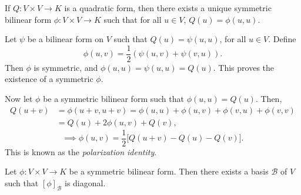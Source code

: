 \documentclass[12pt]{article}
\begin{document}
\begin{proposition}
	If $Q : V \times V \to K$ is a quadratic form, then there exists a unique symmetric bilinear form $\phi : V \times V \to K$ such that for all $u \in V$, $Q(u) = \phi(u, u)$.
\end{proposition}

\begin{proofbox}
	Let $\psi$ be a bilinear form on $V$ such that $Q(u) = \psi(u, u)$, for all $u \in V$. Define
	 \[
		 \phi(u, v) = \frac{1}{2}(\psi(u, v) + \psi(v,u))
	.\]
	Then $\phi$ is symmetric, and $\phi(u, u) = \psi(u, u) = Q(u)$. This proves the existence of a symmetric $\phi$.

	Now let $\phi$ be a symmetric bilinear form such that $\phi(u, u) = Q(u)$. Then,
	\begin{align*}
		Q(u + v) &= \phi(u + v, u + v) = \phi(u, u) + \phi(u, v) + \phi(v, u) + \phi(v, v) \\
			 &= Q(u) + 2 \phi(u, v) + Q(v),
	\end{align*}
	\[
		\implies \phi(u, v) = \frac{1}{2} \bigl[Q(u+v) - Q(u) - Q(v)\bigr]
	.\]
	This is known as the \textit{polarization identity}.
\end{proofbox}

\begin{theorem}
	Let $\phi : V \times V \to K$ be a symmetric bilinear form. Then there exists a basis $\mathcal{B}$ of $V$ such that $[\phi]_{\mathcal{B}}$ is diagonal.
\end{theorem}
\end{document}
